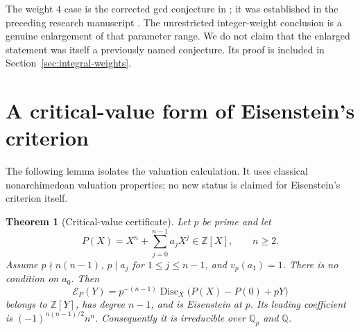 \documentclass[11pt,a4paper]{article}
\newtheorem{theorem}{Theorem}[section]
\theoremstyle{definition}
\theoremstyle{remark}
\newcommand{\QQ}{\mathbb Q}
\newcommand{\ZZ}{\mathbb Z}
\newcommand{\Disc}{\operatorname{Disc}}
\begin{document}
The weight $4$ case is the corrected gcd conjecture in \cite{KSL};
it was established in the preceding research manuscript \cite{Previous}.
The unrestricted integer-weight conclusion is a genuine enlargement
of that parameter range. We do not claim that the enlarged statement
was itself a previously named conjecture. Its proof is included in
Section~\ref{sec:integral-weights}.

\section{A critical-value form of Eisenstein's criterion}\label{sec:criterion}

The following lemma isolates the valuation calculation. It uses
classical nonarchimedean valuation properties; no new status is
claimed for Eisenstein's criterion itself.

\begin{theorem}[Critical-value certificate]\label{thm:criterion}
Let $p$ be prime and let
\[
 P(X)=X^n+\sum_{j=0}^{n-1}a_jX^j\in\ZZ[X],\qquad n\ge2.
\]
Assume $p\nmid n(n-1)$, $p\mid a_j$ for $1\le j\le n-1$, and
$v_p(a_1)=1$. There is no condition on $a_0$. Then
\begin{equation}\label{eq:general-certificate}
 \mathcal E_P(Y)=p^{-(n-1)}
 \Disc_X\bigl(P(X)-P(0)+pY\bigr)
\end{equation}
belongs to $\ZZ[Y]$, has degree $n-1$, and is Eisenstein at $p$.
Its leading coefficient is $(-1)^{n(n-1)/2}n^n$.
Consequently it is irreducible over $\QQ_p$ and $\QQ$.
\end{theorem}
\end{document}
